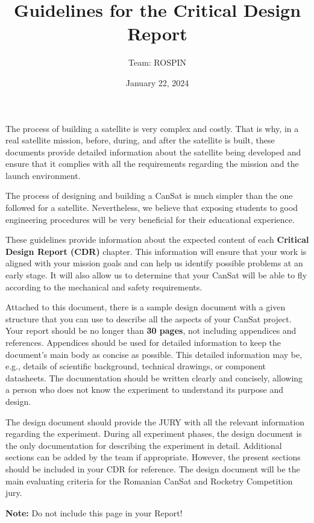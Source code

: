 \documentclass[11pt]{article}
\title{Guidelines for the Critical Design Report
}
\author{Team: ROSPIN}
\date{January 22, 2024}
\begin{document}
\cansattitle



The process of building a satellite is very complex and costly. That is why, in a real satellite mission, before, during, and after the satellite is built, these documents provide detailed information about the satellite being developed and ensure that it complies with all the requirements regarding the mission and the launch environment.

The process of designing and building a CanSat is much simpler than the one followed for a satellite. Nevertheless, we believe that exposing students to good engineering procedures will be very beneficial for their educational experience.

These guidelines provide information about the expected content of each \textbf{Critical Design Report (CDR)} chapter. 
This information will ensure that your work is aligned with your mission goals and can help us identify possible problems at an early stage. 
It will also allow us to determine that your CanSat will be able to fly according to the mechanical and safety requirements.

Attached to this document, there is a sample design document with a given structure that you can use to describe all the aspects of your CanSat project. 
Your report should be no longer than \textbf{30 pages}, not including appendices and references. Appendices should be used for detailed information 
to keep the document's main body as concise as possible. This detailed information may be, e.g., details of scientific background, technical drawings, or 
component datasheets. The documentation should be written clearly and concisely, allowing a person who does not know the experiment to understand its purpose and design.

The design document should provide the JURY with all the relevant information regarding the experiment. 
During all experiment phases, the design document is the only documentation for describing the experiment in detail. 
Additional sections can be added by the team if appropriate. However, the present sections should be included in your CDR for reference. The design document will be the main evaluating criteria for the Romanian CanSat and Rocketry Competition jury.

\vspace{3cm}
{\Large{\textbf{Note:} Do not include this page in your Report!}}
\end{document}
